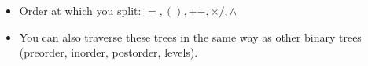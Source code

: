 \documentclass{article}
\begin{document}
\begin{itemize}
\begin{itemize}
\begin{itemize}
\begin{enumerate}
                        \end{enumerate}
                    \item Order at which you split: $=, (), +-, \times/, \wedge$
                    \item You can also traverse these trees in the same way as other binary trees (preorder, inorder, postorder, levels).
                \end{itemize}
        \end{itemize}
    \end{itemize}
\end{document}
